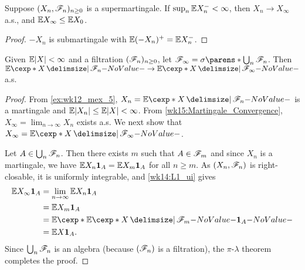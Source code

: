 \documentclass[12pt]{article}
\begin{document}
\begin{Corollary}\label{wk15:Supermartingale_Convergence}
Suppose $(X_n,\mathscr{F}_n)_{n\geq0}$ is a supermartingale. If $\sup_n \E X_n^- <\infty$, then $X_n\to X_\infty$ a.s., and $\E X_\infty \leq \E X_0$.
\end{Corollary}
\begin{proof}
$-X_n$ is submartingale with $\E(-X_n)^+ = \E X_n^-$.
\end{proof}



\begin{Theorem}\label{wk15:LevyConvergence}
Given $\E|X|<\infty$ and a filtration $(\mathscr{F}_n)_{n\geq0}$, let $\scF_\infty=\sigma\parens*{\bigcup_n \scF_n}$. Then $\E[X \given \scF_n] \to \E[X \given \scF_\infty]$ a.s.
\end{Theorem}
\begin{proof}
From \cref{ex:wk12_mex_5}, $X_n = \E[X \given \scF_n]$ is a martingale and $\E|X_n| \leq \E|X| <\infty$. From \cref{wk15:Martingale_Convergence}, $X_\infty = \lim_{n\to\infty} X_n$ exists a.s. We next show that $X_\infty = \E[ X \given \scF_\infty]$. 

Let $A\in \bigcup_n \mathscr{F}_n$. Then there exists $m$ such that $A\in\mathscr{F}_m$ and since $X_n$ is a martingale, we have $\E X_n\indicatore{A} = \E X_m\indicatore{A}$ for all $n\geq m$. As $(X_n,\mathscr{F}_n)$ is right-closable, it is uniformly integrable, and \cref{wk14:L1_ui} gives
\begin{align*}
\E X_\infty\indicatore{A} 
&= \lim_{n\to\infty} \E X_n\indicatore{A} \\
&= \E X_m\indicatore{A} \\
&= \E[ {\E[X \given \scF_m]}\indicatore{A}] \\
&= \E X\indicatore{A}.
\end{align*}
Since $\bigcup_n \mathscr{F}_n$ is an algebra (because $(\mathscr{F}_n)$ is a filtration), the $\pi$-$\lambda$ theorem completes the proof.
\end{proof}
\end{document}
